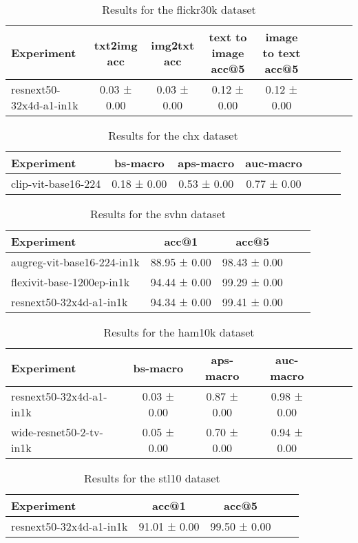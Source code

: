 \begin{table}[htbp]
\caption{Results for the flickr30k dataset}
\begin{tabular}{|l|c|c|c|c|c|c|c|c|}\hline
Experiment & txt2img acc & img2txt acc & text to image acc@5 & image to text acc@5\\
\hline
resnext50-32x4d-a1-in1k & 0.03 ± 0.00 & 0.03 ± 0.00 & 0.12 ± 0.00 & 0.12 ± 0.00\\
\hline
\end{tabular}
\end{table}

\begin{table}[htbp]
\caption{Results for the chx dataset}
\begin{tabular}{|l|c|c|c|c|c|c|}\hline
Experiment & bs-macro & aps-macro & auc-macro\\
\hline
clip-vit-base16-224 & 0.18 ± 0.00 & 0.53 ± 0.00 & 0.77 ± 0.00\\
\hline
\end{tabular}
\end{table}

\begin{table}[htbp]
\caption{Results for the svhn dataset}
\begin{tabular}{|l|c|c|c|c|}\hline
Experiment & acc@1 & acc@5\\
\hline
augreg-vit-base16-224-in1k & 88.95 ± 0.00 & 98.43 ± 0.00\\
\hline
flexivit-base-1200ep-in1k & 94.44 ± 0.00 & 99.29 ± 0.00\\
\hline
resnext50-32x4d-a1-in1k & 94.34 ± 0.00 & 99.41 ± 0.00\\
\hline
\end{tabular}
\end{table}

\begin{table}[htbp]
\caption{Results for the ham10k dataset}
\begin{tabular}{|l|c|c|c|c|c|c|}\hline
Experiment & bs-macro & aps-macro & auc-macro\\
\hline
resnext50-32x4d-a1-in1k & 0.03 ± 0.00 & 0.87 ± 0.00 & 0.98 ± 0.00\\
\hline
wide-resnet50-2-tv-in1k & 0.05 ± 0.00 & 0.70 ± 0.00 & 0.94 ± 0.00\\
\hline
\end{tabular}
\end{table}

\begin{table}[htbp]
\caption{Results for the stl10 dataset}
\begin{tabular}{|l|c|c|c|c|}\hline
Experiment & acc@1 & acc@5\\
\hline
resnext50-32x4d-a1-in1k & 91.01 ± 0.00 & 99.50 ± 0.00\\
\hline
\end{tabular}
\end{table}

